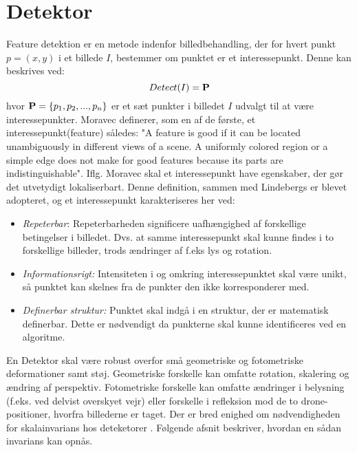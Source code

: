 \section{Detektor}\label{sec:detect}
Feature detektion er en metode indenfor billedbehandling, der for hvert punkt $p = (x,y)$ i et billede $I$, bestemmer om punktet er et interessepunkt. Denne kan beskrives ved:
\begin{equation}
Detect(I)= \bold{P}
\label{detect}
\end{equation}
hvor $\bold{P} = \lbrace p_1, p_2,..., p_n \rbrace$ er et sæt punkter i billedet $I$ udvalgt til at være interessepunkter. Moravec \cite{moravec} definerer, som en af de første, et interessepunkt(feature) således: "A
feature is good if it can be located unambiguously in different views of a scene. A
uniformly colored region or a simple edge does not make for good features because
its parts are indistinguishable". Iflg. Moravec skal et interessepunkt have egenskaber, der gør det utvetydigt lokaliserbart. Denne definition, sammen med Lindebergs \cite{pointsurvey} er blevet adopteret, og et interessepunkt karakteriseres her ved:
\begin{itemize}
\item{\emph{Repeterbar}: Repeterbarheden significere uafhængighed af forskellige betingelser i billedet. Dvs. at samme interessepunkt skal kunne findes i to forskellige billeder, trods ændringer af f.eks lys og rotation.}
\item{\emph{Informationsrigt:}
Intensiteten i og omkring interessepunktet skal være unikt, så punktet kan skelnes fra de punkter den ikke korresponderer med.}
\item{\textit{Definerbar struktur:} Punktet skal indgå i en struktur, der er matematisk definerbar. Dette er nødvendigt da punkterne skal kunne identificeres ved en algoritme.}
\end{itemize}
En Detektor skal være robust overfor små geometriske og fotometriske deformationer samt støj. Geometriske forskelle kan omfatte rotation, skalering og ændring af perspektiv.  Fotometriske forskelle kan omfatte ændringer i belysning (f.eks. ved delvist overskyet vejr) eller forskelle i refleksion mod de to drone-positioner, hvorfra billederne er taget. Der er bred enighed om nødvendigheden for skalainvarians hos deteketorer \cite{koen} \cite{blob} \cite{lindenscale}. Følgende afsnit beskriver, hvordan en sådan invarians kan opnås.
\raggedbottom
\raggedbottom